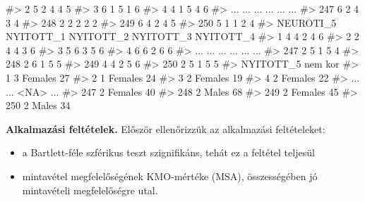 \documentclass[
  letterpaper,
]{krantz}
\makeatletter
\newenvironment{Shaded}{\begin{snugshade}}{\end{snugshade}}
\newcommand{\CommentTok}[1]{\textcolor[rgb]{0.37,0.37,0.37}{#1}}
\providecommand{\tightlist}{%
  \setlength{\itemsep}{0pt}\setlength{\parskip}{0pt}}\usepackage{longtable,booktabs,array}
\newenvironment{kframe}{%
\medskip{}
\setlength{\fboxsep}{.8em}
 \def\at@end@of@kframe{}%
 \ifinner\ifhmode%
  \def\at@end@of@kframe{\end{minipage}}%
  \begin{minipage}{\columnwidth}%
 \fi\fi%
 \def\FrameCommand##1{\hskip\@totalleftmargin \hskip-\fboxsep
 \colorbox{shadecolor}{##1}\hskip-\fboxsep
     \hskip-\linewidth \hskip-\@totalleftmargin \hskip\columnwidth}%
 \MakeFramed {\advance\hsize-\width
   \@totalleftmargin\z@ \linewidth\hsize
   \@setminipage}}%
 {\par\unskip\endMakeFramed%
 \at@end@of@kframe}
\renewenvironment{Shaded}{\begin{kframe}}{\end{kframe}}
\makeatother
\begin{document}
\begin{Shaded}
\begin{Highlighting}[]
\CommentTok{\#\textgreater{} 2           5         2         4         4         5}
\CommentTok{\#\textgreater{} 3           6         1         5         1         6}
\CommentTok{\#\textgreater{} 4           4         1         5         4         6}
\CommentTok{\#\textgreater{} ...       ...       ...       ...       ...       ...}
\CommentTok{\#\textgreater{} 247         6         2         4         3         4}
\CommentTok{\#\textgreater{} 248         2         2         2         2         2}
\CommentTok{\#\textgreater{} 249         6         4         2         4         5}
\CommentTok{\#\textgreater{} 250         5         1         1         2         4}
\CommentTok{\#\textgreater{}     NEUROTI\_5 NYITOTT\_1 NYITOTT\_2 NYITOTT\_3 NYITOTT\_4}
\CommentTok{\#\textgreater{} 1           4         4         2         4         6}
\CommentTok{\#\textgreater{} 2           2         4         4         3         6}
\CommentTok{\#\textgreater{} 3           5         6         3         5         6}
\CommentTok{\#\textgreater{} 4           6         6         2         6         6}
\CommentTok{\#\textgreater{} ...       ...       ...       ...       ...       ...}
\CommentTok{\#\textgreater{} 247         2         5         1         5         4}
\CommentTok{\#\textgreater{} 248         2         6         1         5         5}
\CommentTok{\#\textgreater{} 249         4         4         2         5         6}
\CommentTok{\#\textgreater{} 250         2         5         1         5         5}
\CommentTok{\#\textgreater{}     NYITOTT\_5     nem kor}
\CommentTok{\#\textgreater{} 1           3 Females  27}
\CommentTok{\#\textgreater{} 2           1 Females  24}
\CommentTok{\#\textgreater{} 3           2 Females  19}
\CommentTok{\#\textgreater{} 4           2 Females  22}
\CommentTok{\#\textgreater{} ...       ...    \textless{}NA\textgreater{} ...}
\CommentTok{\#\textgreater{} 247         2 Females  40}
\CommentTok{\#\textgreater{} 248         2   Males  68}
\CommentTok{\#\textgreater{} 249         2 Females  45}
\CommentTok{\#\textgreater{} 250         2   Males  34}
\end{Highlighting}
\end{Shaded}

\textbf{Alkalmazási feltételek.} Először ellenőrizzük az alkalmazási
feltételeket:

\begin{itemize}
\tightlist
\item
  a Bartlett-féle szférikus teszt szignifikáns, tehát ez a feltétel
  teljesül
\item
  mintavétel megfelelőségének KMO-mértéke (MSA), összességében jó
  mintavételi megfelelőségre utal.
\end{itemize}
\end{document}
